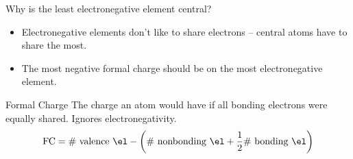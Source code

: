\documentclass[notes=hide]{beamer}
\begin{document}
\begin{frame}{Why is the least electronegative element central?}
	\begin{itemize}
		\item Electronegative elements don't like to share electrons --
			central atoms have to share the most.
		\item The most negative \alert{formal charge} should be on the
			most electronegative element.
	\end{itemize}

	\begin{block}{Formal Charge}
		The charge an atom would have if all bonding electrons were
		equally shared. Ignores electronegativity.
		\begin{equation*}
			\text{FC} = \text{\# valence \el} -
			\left(\text{\# nonbonding \el} + \frac{1}{2}\text{\# bonding
			\el}\right)
		\end{equation*}
	\end{block}
\end{frame}

%
%
\end{document}
